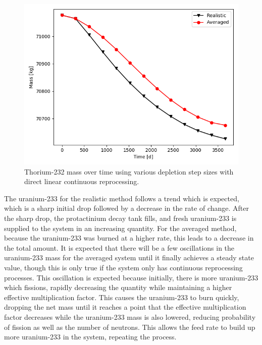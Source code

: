 \begin{figure}[H]
  \centering
  \includegraphics[scale=0.7]{images/adv-Th232.png}
  \caption{Thorium-232 mass over time using various depletion step sizes with direct linear continuous reprocessing.}
   \label{fig:DL-cont-th-adv}
\end{figure}

The uranium-233 for the realistic method follows a trend which is expected, which is a sharp initial drop followed by a decrease in the rate of change. After the sharp drop, the protactinium decay tank fills, and fresh uranium-233 is supplied to the system in an increasing quantity. For the averaged method, because the uranium-233 was burned at a higher rate, this leads to a decrease in the total amount. It is expected that there will be a few oscillations in the uranium-233 mass for the averaged system until it finally achieves a steady state value, though this is only true if the system only has continuous reprocessing processes. This oscillation is expected because initially, there is more uranium-233 which fissions, rapidly decreasing the quantity while maintaining a higher effective multiplication factor. This causes the uranium-233 to burn quickly, dropping the net mass until it reaches a point that the effective multiplication factor decreases while the uranium-233 mass is also lowered, reducing probability of fission as well as the number of neutrons. This allows the feed rate to build up more uranium-233 in the system, repeating the process.

